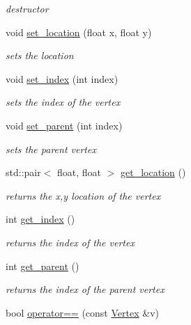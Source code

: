 \begin{DoxyCompactItemize}
\begin{DoxyCompactList}\small\item\em destructor \end{DoxyCompactList}\item 
void \hyperlink{classturtlebot__rrt_1_1Vertex_a3eae280de131550a7b69fda426933e24}{set\+\_\+location} (float x, float y)
\begin{DoxyCompactList}\small\item\em sets the location \end{DoxyCompactList}\item 
void \hyperlink{classturtlebot__rrt_1_1Vertex_ada62799b4c6cba1ba5fc812a935c7487}{set\+\_\+index} (int index)
\begin{DoxyCompactList}\small\item\em sets the index of the vertex \end{DoxyCompactList}\item 
void \hyperlink{classturtlebot__rrt_1_1Vertex_a84efb31fdc47e4e2b4283100029db265}{set\+\_\+parent} (int index)
\begin{DoxyCompactList}\small\item\em sets the parent vertex \end{DoxyCompactList}\item 
std\+::pair$<$ float, float $>$ \hyperlink{classturtlebot__rrt_1_1Vertex_aa71422cc4c6d3cc363478beaedf23a88}{get\+\_\+location} ()
\begin{DoxyCompactList}\small\item\em returns the x,y location of the vertex \end{DoxyCompactList}\item 
int \hyperlink{classturtlebot__rrt_1_1Vertex_a63512ad96a03558512b69280329761b8}{get\+\_\+index} ()
\begin{DoxyCompactList}\small\item\em returns the index of the vertex \end{DoxyCompactList}\item 
int \hyperlink{classturtlebot__rrt_1_1Vertex_a41cae85656e4b2e32bee26ba5876b6d1}{get\+\_\+parent} ()
\begin{DoxyCompactList}\small\item\em returns the index of the parent vertex \end{DoxyCompactList}\item 
bool \hyperlink{classturtlebot__rrt_1_1Vertex_a1c743214d3566891fb0c88c60c337a08}{operator==} (const \hyperlink{classturtlebot__rrt_1_1Vertex}{Vertex} \&v)\hypertarget{classturtlebot__rrt_1_1Vertex_a1c743214d3566891fb0c88c60c337a08}{}\label{classturtlebot__rrt_1_1Vertex_a1c743214d3566891fb0c88c60c337a08}


\end{DoxyCompactItemize}
